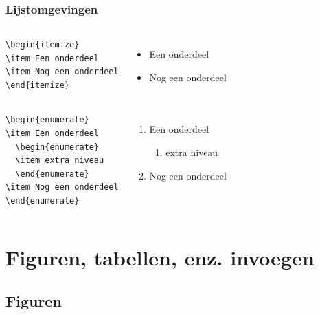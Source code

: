 \documentclass[aspectratio=169]{beamer}
\begin{document}
\begin{frame}[fragile]
  \frametitle{Lijstomgevingen}
  
  \begin{columns}[c]
\begin{verbatim}  
\begin{itemize}
\item Een onderdeel
\item Nog een onderdeel
\end{itemize}
\end{verbatim}

\begin{itemize}
\item Een onderdeel
\item Nog een onderdeel
\end{itemize}
  \end{columns}

\pause

  \begin{columns}[c]
\begin{verbatim}  
\begin{enumerate}
\item Een onderdeel
  \begin{enumerate}
  \item extra niveau
  \end{enumerate}
\item Nog een onderdeel
\end{enumerate}
\end{verbatim}

\begin{enumerate}
\item Een onderdeel
  \begin{enumerate}
  \item extra niveau
  \end{enumerate}
\item Nog een onderdeel
\end{enumerate}
  \end{columns}

\end{frame}

\section{Figuren, tabellen, enz. invoegen}

\subsection{Figuren}
\end{document}

